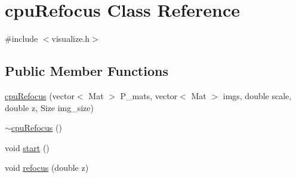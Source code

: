 \hypertarget{classcpuRefocus}{\section{cpu\-Refocus Class Reference}
\label{db/df2/classcpuRefocus}
}


{\ttfamily \#include $<$visualize.\-h$>$}

\subsection*{Public Member Functions}
\begin{DoxyCompactItemize}
\item 
\hyperlink{classcpuRefocus_a3866f972073b5532628f44be97aaa33d}{cpu\-Refocus} (vector$<$ Mat $>$ P\-\_\-mats, vector$<$ Mat $>$ imgs, double scale, double z, Size img\-\_\-size)
\item 
\hyperlink{classcpuRefocus_a64b13f3ff7051ab641756773c5d66979}{$\sim$cpu\-Refocus} ()
\item 
void \hyperlink{classcpuRefocus_a013771771ba3e9a6a8ad3f4632ff38a0}{start} ()
\item 
void \hyperlink{classcpuRefocus_aaeaf04bd8af93b84a2b0294ea101ae06}{refocus} (double z)
\end{DoxyCompactItemize}


